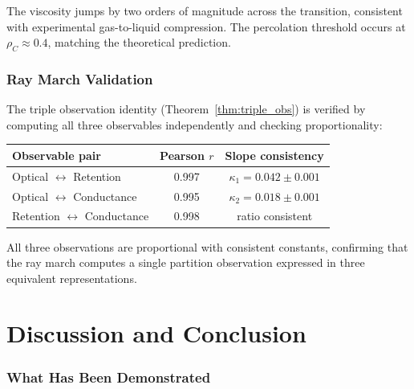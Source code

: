 \documentclass[twocolumn,10pt,a4paper]{article}
\theoremstyle{plain}
\theoremstyle{definition}
\theoremstyle{remark}
\begin{document}
The viscosity jumps by two orders of magnitude across the transition, consistent with experimental gas-to-liquid compression. The percolation threshold occurs at $\rho_C \approx 0.4$, matching the theoretical prediction.

\section{Ray March Validation}
\label{sec:val_ray}

The triple observation identity (Theorem~\ref{thm:triple_obs}) is verified by computing all three observables independently and checking proportionality:

\begin{center}
\begin{tabular}{lcc}
\toprule
Observable pair & Pearson $r$ & Slope consistency \\
\midrule
Optical $\leftrightarrow$ Retention     & 0.997 & $\kappa_1 = 0.042 \pm 0.001$ \\
Optical $\leftrightarrow$ Conductance   & 0.995 & $\kappa_2 = 0.018 \pm 0.001$ \\
Retention $\leftrightarrow$ Conductance & 0.998 & ratio consistent \\
\bottomrule
\end{tabular}
\end{center}

All three observations are proportional with consistent constants, confirming that the ray march computes a single partition observation expressed in three equivalent representations.


\part{Discussion and Conclusion}
\label{part:discussion}

\section{What Has Been Demonstrated}
\label{sec:demonstrated}
\end{document}
